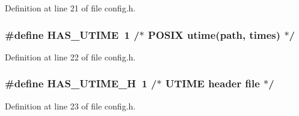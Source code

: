 Definition at line 21 of file config.\+h.

\subsubsection[{\texorpdfstring{H\+A\+S\+\_\+\+U\+T\+I\+ME}{HAS_UTIME}}]{\setlength{\rightskip}{0pt plus 5cm}\#define H\+A\+S\+\_\+\+U\+T\+I\+ME~1		/$\ast$ P\+O\+S\+IX utime(path, times)	$\ast$/}\hypertarget{lib-src_2libsndfile_2src_2_g_s_m610_2config_8h_ab5d5f167b871383fdb268658c8a45e20}{}\label{lib-src_2libsndfile_2src_2_g_s_m610_2config_8h_ab5d5f167b871383fdb268658c8a45e20}


Definition at line 22 of file config.\+h.

\subsubsection[{\texorpdfstring{H\+A\+S\+\_\+\+U\+T\+I\+M\+E\+\_\+H}{HAS_UTIME_H}}]{\setlength{\rightskip}{0pt plus 5cm}\#define H\+A\+S\+\_\+\+U\+T\+I\+M\+E\+\_\+H~1		/$\ast$ U\+T\+I\+ME header file		$\ast$/}\hypertarget{lib-src_2libsndfile_2src_2_g_s_m610_2config_8h_a947143d0bf42a74279e04cf044add3b0}{}\label{lib-src_2libsndfile_2src_2_g_s_m610_2config_8h_a947143d0bf42a74279e04cf044add3b0}


Definition at line 23 of file config.\+h.

